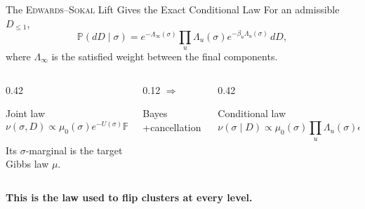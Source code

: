 \begin{frame}{The \textsc{Edwards}--\textsc{Sokal} Lift Gives the Exact Conditional Law}
  For an admissible $D_{\leq1}$,
  \[
    \boxed{
    \mathbb P(dD\mid\sigma)
      =e^{-\Lambda_\infty(\sigma)}
       \prod_{u}
       \Lambda_u(\sigma)e^{-\beta_u\Lambda_u(\sigma)}\,dD,}
  \]
  where $\Lambda_\infty$ is the satisfied weight between the final components.

  \begin{columns}[onlytextwidth,c]
    \begin{column}{0.42\textwidth}
      \begin{block}{Joint law}
        \[
          \nu(\sigma,D)
          \propto
          \mu_0(\sigma)e^{-U(\sigma)}
          \mathbb P(D\mid\sigma).
        \]
      \end{block}
      Its $\sigma$-marginal is the target Gibbs law $\mu$.
    \end{column}

    \begin{column}{0.12\textwidth}
      \centering
      \textcolor{inria-2024-rouge}{\Large $\Longrightarrow$}

      \scriptsize
      Bayes +\newline cancellation
    \end{column}

    \begin{column}{0.42\textwidth}
      \begin{block}{Conditional law}
        \[
          \boxed{
          \nu(\sigma\mid D)
          \propto
          \mu_0(\sigma)
          \prod_u
          \Lambda_u(\sigma)e^{(1-\beta_u)\Lambda_u(\sigma)}.}
        \]
      \end{block}
    \end{column}
  \end{columns}

  \begin{center}
    \textbf{This is the law used to flip clusters at every level.}
  \end{center}
\end{frame}


